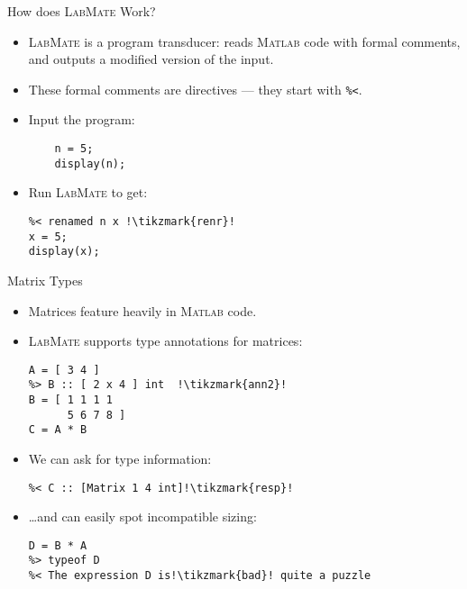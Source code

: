 \documentclass[]{beamer}
\newcommand{\tikzmark}[1]{\tikz[overlay,remember picture,baseline=-0.5ex] \node (#1) {};}
\newcommand{\lm}{\textsc{LabMate}\xspace}
\newcommand{\ma}{\textsc{Matlab}\xspace}
\begin{document}

\begin{frame}[fragile]{How does \lm Work?}
  \begin{itemize}
  \item \lm is a program transducer: reads \ma code with formal comments, and outputs a modified version of the input.
    \medskip
  \item These formal comments are directives --- they start with \textcolor{commentgreen}{\texttt{\%<}}.
    \medskip
  \item Input the program:
   \begin{lstlisting}[xleftmargin=2em]
    %> rename n x !\tikzmark{ren}!
    n = 5;
    display(n);
   \end{lstlisting}
  \pause
  \pause
\item Run \lm to get:
  \begin{lstlisting}[xleftmargin=2em]
%< LabMate 0.2.0.1 !\tikzmark{ver}!
%< renamed n x !\tikzmark{renr}!
x = 5;
display(x);
   \end{lstlisting}
  \pause
\end{itemize}
\end{frame}

\begin{frame}[fragile]{Matrix Types}
  \begin{itemize}[<+->]
  \item Matrices feature heavily in \ma code.
    \medskip
  \item \lm supports type annotations for matrices:
\begin{lstlisting}[xleftmargin=0em, belowskip=-0.5em]
%> A :: [ 1 x 2 ] int  !\tikzmark{ann1}!
A = [ 3 4 ]
%> B :: [ 2 x 4 ] int  !\tikzmark{ann2}!
B = [ 1 1 1 1
      5 6 7 8 ]
C = A * B
\end{lstlisting}
  \pause
  \item We can ask for type information:
\begin{lstlisting}[xleftmargin=0em, belowskip=-0.5em]
%> typeof C !\tikzmark{query}!
%< C :: [Matrix 1 4 int]!\tikzmark{resp}!
\end{lstlisting}
 \pause
  \item \ldots and can easily spot incompatible sizing:
\begin{lstlisting}[xleftmargin=0em]
D = B * A
%> typeof D
%< The expression D is!\tikzmark{bad}! quite a puzzle
\end{lstlisting}
    \pause
\end{itemize}
\end{frame}
\end{document}

